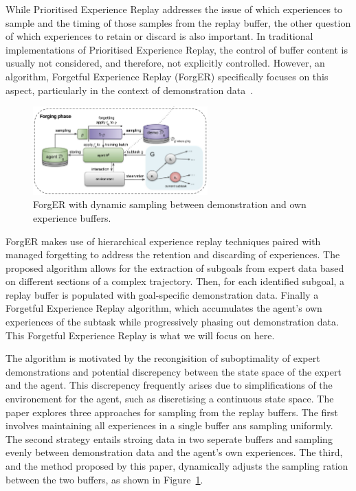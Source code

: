 While Prioritised Experience Replay addresses the issue of which experiences to sample and the timing of those samples from the replay buffer, the other question of which experiences to retain or discard is also important. 
In traditional implementations of Prioritised Experience Replay, the control of buffer content is usually not considered, and therefore, not explicitly controlled. 
However, an algorithm, Forgetful Experience Replay (ForgER) specifically focuses on this aspect, particularly in the context of demonstration data~\cite{fyp16-forgetful-experience-replay}.

\begin{figure}[htbp]
  \centering
  \includegraphics[width=0.6\textwidth]{background/fyp16-forger-arch.png}
  \caption{ForgER with dynamic sampling between demonstration and own experience buffers.}
\label{fig:fyp16-forger-arch}
\end{figure}

ForgER makes use of hierarchical experience replay techniques paired with managed forgetting to address the retention and discarding of experiences. 
The proposed algorithm allows for the extraction of subgoals from expert data based on different sections of a complex trajectory. 
Then, for each identified subgoal, a replay buffer is populated with goal-specific demonstration data. 
Finally a Forgetful Experience Replay algorithm, which accumulates the agent's own experiences of the subtask while progressively phasing out demonstration data.
This Forgetful Experience Replay is what we will focus on here.

The algorithm is motivated by the recongisition of suboptimality of expert demonstrations and potential discrepency between the state space of the expert and the agent.
This discrepency frequently arises due to simplifications of the environement for the agent, such as discretising a continuous state space.
The paper explores three approaches for sampling from the replay buffers.
The first involves maintaining all experiences in a single buffer ans sampling uniformly.
The second strategy entails stroing data in two seperate buffers and sampling evenly between demonstration data and the agent's own experiences.
The third, and the method proposed by this paper, dynamically adjusts the sampling ration between the two buffers, as shown in Figure~\ref{fig:fyp16-forger-arch}.

